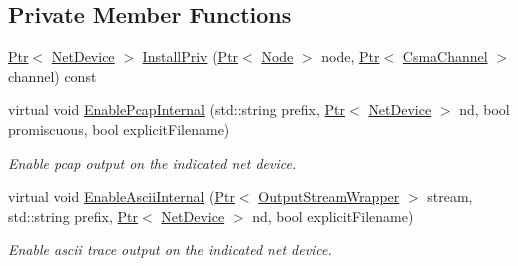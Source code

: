 \subsection*{Private Member Functions}
\begin{DoxyCompactItemize}
\item 
\hyperlink{classns3_1_1Ptr}{Ptr}$<$ \hyperlink{classns3_1_1NetDevice}{Net\+Device} $>$ \hyperlink{classns3_1_1CsmaHelper_a9376eef03ab0534ce090b6ad135eb9c3}{Install\+Priv} (\hyperlink{classns3_1_1Ptr}{Ptr}$<$ \hyperlink{classns3_1_1Node}{Node} $>$ node, \hyperlink{classns3_1_1Ptr}{Ptr}$<$ \hyperlink{classns3_1_1CsmaChannel}{Csma\+Channel} $>$ channel) const 
\item 
virtual void \hyperlink{classns3_1_1CsmaHelper_a3a3b8319bd49352ac6e597acc48c4485}{Enable\+Pcap\+Internal} (std\+::string prefix, \hyperlink{classns3_1_1Ptr}{Ptr}$<$ \hyperlink{classns3_1_1NetDevice}{Net\+Device} $>$ nd, bool promiscuous, bool explicit\+Filename)
\begin{DoxyCompactList}\small\item\em Enable pcap output on the indicated net device. \end{DoxyCompactList}\item 
virtual void \hyperlink{classns3_1_1CsmaHelper_af2eac110641882febd39247258efda54}{Enable\+Ascii\+Internal} (\hyperlink{classns3_1_1Ptr}{Ptr}$<$ \hyperlink{classns3_1_1OutputStreamWrapper}{Output\+Stream\+Wrapper} $>$ stream, std\+::string prefix, \hyperlink{classns3_1_1Ptr}{Ptr}$<$ \hyperlink{classns3_1_1NetDevice}{Net\+Device} $>$ nd, bool explicit\+Filename)
\begin{DoxyCompactList}\small\item\em Enable ascii trace output on the indicated net device. \end{DoxyCompactList}\end{DoxyCompactItemize}
